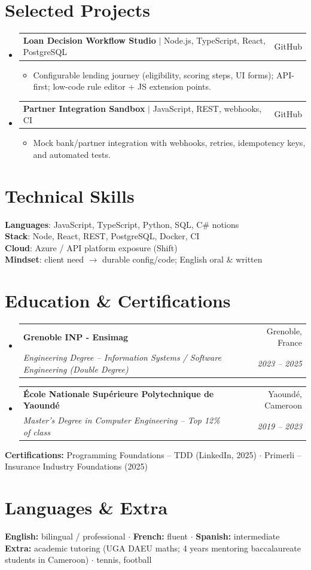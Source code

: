 \documentclass[letterpaper,10.5pt]{article}
\makeatletter
\newcommand{\resumeItem}[1]{\item\small{#1 \vspace{-1.5pt}}}
\newcommand{\resumeSubheading}[4]{
  \vspace{-1pt}\item
    \begin{tabular*}{0.97\textwidth}[t]{l@{\extracolsep{\fill}}r}
      \textbf{#1} & #2 \\
      \textit{\small#3} & \textit{\small #4} \\
    \end{tabular*}\vspace{-5pt}
}
\newcommand{\resumeProjectHeading}[2]{
    \item
    \begin{tabular*}{0.97\textwidth}{l@{\extracolsep{\fill}}r}
      \small#1 & #2 \\
    \end{tabular*}\vspace{-5pt}
}
\newcommand{\resumeSubHeadingListStart}{\begin{itemize}[leftmargin=0.15in, label={}]}
\newcommand{\resumeSubHeadingListEnd}{\end{itemize}}
\newcommand{\resumeItemListStart}{\begin{itemize}[leftmargin=0.18in]}
\newcommand{\resumeItemListEnd}{\end{itemize}\vspace{-3pt}}
\makeatother
\begin{document}
\section{Selected Projects}

\resumeSubHeadingListStart

  \resumeProjectHeading
    {\textbf{Loan Decision Workflow Studio} $|$ Node.js, TypeScript, React, PostgreSQL}{GitHub}
    \resumeItemListStart
      \resumeItem{Configurable lending journey (eligibility, scoring steps, UI forms); API-first; low-code rule editor + JS extension points.}
    \resumeItemListEnd
  \resumeProjectHeading
    {\textbf{Partner Integration Sandbox} $|$ JavaScript, REST, webhooks, CI}{GitHub}
    \resumeItemListStart
      \resumeItem{Mock bank/partner integration with webhooks, retries, idempotency keys, and automated tests.}
    \resumeItemListEnd
\resumeSubHeadingListEnd

\section{Technical Skills}

\begin{itemize}[leftmargin=0.15in, label={}]
  \small{\item{
\textbf{Languages}: JavaScript, TypeScript, Python, SQL, C\# notions \\
\textbf{Stack}: Node, React, REST, PostgreSQL, Docker, CI \\
\textbf{Cloud}: Azure / API platform exposure (Shift) \\
\textbf{Mindset}: client need $\rightarrow$ durable config/code; English oral \& written
  }}
\end{itemize}

\section{Education \& Certifications}

\resumeSubHeadingListStart
  \resumeSubheading
    {Grenoble INP - Ensimag}{Grenoble, France}
    {Engineering Degree -- Information Systems / Software Engineering (Double Degree)}{2023 -- 2025}
  \resumeSubheading
    {\'Ecole Nationale Sup\'erieure Polytechnique de Yaound\'e}{Yaound\'e, Cameroon}
    {Master's Degree in Computer Engineering -- Top 12\% of class}{2019 -- 2023}
\resumeSubHeadingListEnd
\small{
\textbf{Certifications:} Programming Foundations -- TDD (LinkedIn, 2025) $\cdot$ Primerli -- Insurance Industry Foundations (2025)
}

\section{Languages \& Extra}
\small{
\textbf{English:} bilingual / professional $\cdot$ \textbf{French:} fluent $\cdot$ \textbf{Spanish:} intermediate \\
\textbf{Extra:} academic tutoring (UGA DAEU maths; 4 years mentoring baccalaureate students in Cameroon) $\cdot$ tennis, football
}
\end{document}
